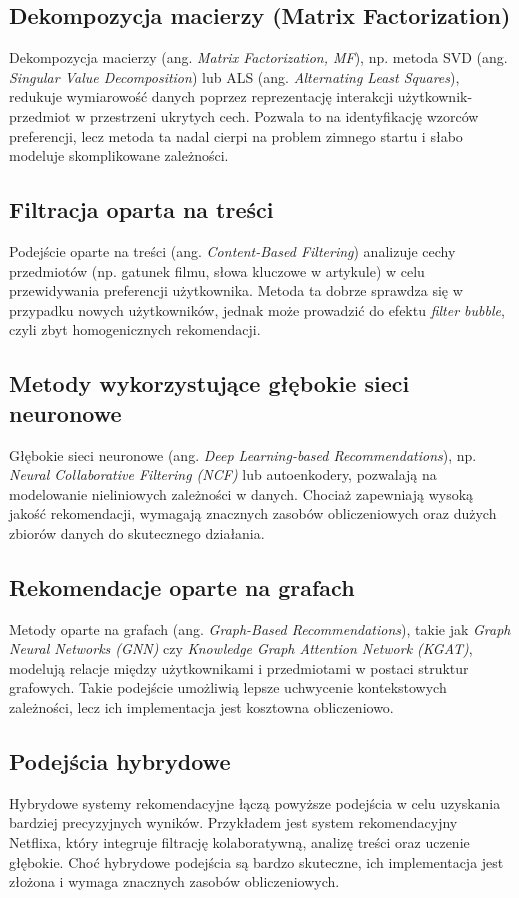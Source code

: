 \documentclass[a4paper,onecolumn]{LTJournalArticle}
\begin{document}
\subsection{Dekompozycja macierzy (Matrix Factorization)}
Dekompozycja macierzy (ang. \textit{Matrix Factorization, MF}), np. metoda SVD (ang. \textit{Singular Value Decomposition}) lub ALS (ang. \textit{Alternating Least Squares}), redukuje wymiarowość danych poprzez reprezentację interakcji użytkownik-przedmiot w przestrzeni ukrytych cech. Pozwala to na identyfikację wzorców preferencji, lecz metoda ta nadal cierpi na problem zimnego startu i słabo modeluje skomplikowane zależności.

\subsection{Filtracja oparta na treści}
Podejście oparte na treści (ang. \textit{Content-Based Filtering}) analizuje cechy przedmiotów (np. gatunek filmu, słowa kluczowe w artykule) w celu przewidywania preferencji użytkownika. Metoda ta dobrze sprawdza się w przypadku nowych użytkowników, jednak może prowadzić do efektu \textit{filter bubble}, czyli zbyt homogenicznych rekomendacji.

\subsection{Metody wykorzystujące głębokie sieci neuronowe}
Głębokie sieci neuronowe (ang. \textit{Deep Learning-based Recommendations}), np. \textit{Neural Collaborative Filtering (NCF)} lub autoenkodery, pozwalają na modelowanie nieliniowych zależności w danych. Chociaż zapewniają wysoką jakość rekomendacji, wymagają znacznych zasobów obliczeniowych oraz dużych zbiorów danych do skutecznego działania.

\subsection{Rekomendacje oparte na grafach}
Metody oparte na grafach (ang. \textit{Graph-Based Recommendations}), takie jak \textit{Graph Neural Networks (GNN)} czy \textit{Knowledge Graph Attention Network (KGAT)}, modelują relacje między użytkownikami i przedmiotami w postaci struktur grafowych. Takie podejście umożliwią lepsze uchwycenie kontekstowych zależności, lecz ich implementacja jest kosztowna obliczeniowo.

\subsection{Podejścia hybrydowe}
Hybrydowe systemy rekomendacyjne łączą powyższe podejścia w celu uzyskania bardziej precyzyjnych wyników. Przykładem jest system rekomendacyjny Netflixa, który integruje filtrację kolaboratywną, analizę treści oraz uczenie głębokie. Choć hybrydowe podejścia są bardzo skuteczne, ich implementacja jest złożona i wymaga znacznych zasobów obliczeniowych.
\end{document}
